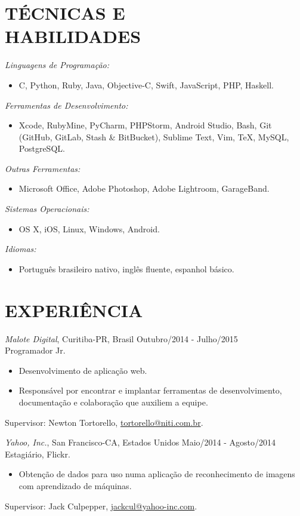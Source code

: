 \documentclass[margin]{res}
\begin{document}
\begin{resume}
		\section{TÉCNICAS E \\ HABILIDADES}
			{\sl Linguagens de Programação:}
			\begin{itemize}
	 			\item[] C, Python, Ruby, Java, Objective-C, Swift, JavaScript, PHP, Haskell.
	  		\end{itemize}
			{\sl Ferramentas de Desenvolvimento:}
			\begin{itemize}
				\item [] Xcode, RubyMine, PyCharm, PHPStorm, Android Studio, Bash, Git (GitHub, GitLab, Stash \& BitBucket), Sublime Text, Vim, \TeX, MySQL, PostgreSQL.
			\end{itemize}
			{\sl Outras Ferramentas:}
			\begin{itemize}
	 			\item[] Microsoft Office, Adobe Photoshop, Adobe Lightroom, GarageBand.
			\end{itemize}
		    {\sl Sistemas Operacionais:}
	 		\begin{itemize}
	 			\item[] OS X, iOS, Linux, Windows, Android.
	   		\end{itemize}
			{\sl Idiomas:}
			\begin{itemize}
				\item[] Português brasileiro nativo, inglês fluente, espanhol básico.
			\end{itemize}

 		\section{EXPERIÊNCIA}
			{\sl Malote Digital}, Curitiba-PR, Brasil \hfill Outubro/2014 - Julho/2015 \\
			Programador Jr.
			\begin{itemize}
				\itemsep -2pt
		    	\item Desenvolvimento de aplicação web.
				\item Responsável por encontrar e implantar ferramentas de desenvolvimento, documentação e colaboração que auxiliem a equipe.
			\end{itemize}
			Supervisor: Newton Tortorello, \href{mailto:tortorello@niti.com.br}{tortorello@niti.com.br}.
			
			{\sl Yahoo, Inc.}, San Francisco-CA, Estados Unidos \hfill Maio/2014 - Agosto/2014 \\
			Estagiário, Flickr.
			\begin{itemize}
				\itemsep -2pt
		    	\item Obtenção de dados para uso numa aplicação de reconhecimento de imagens com aprendizado de máquinas.
			\end{itemize}
			Supervisor: Jack Culpepper, \href{mailto:jackcul@yahoo-inc.com}{jackcul@yahoo-inc.com}.


\end{resume}
\end{document}
